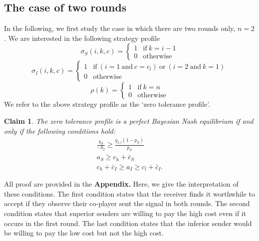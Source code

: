 \documentclass[11pt]{article}
\theoremstyle{plainCl1}
\newtheorem{Claim}{Claim}
\begin{document}

\subsection{The case of two rounds}

In the following, we first study the case in which there are two rounds only, $n\!=\!2$. We are interested in the following strategy profile
\begin{equation}
\sigma_S(i,k,c) = \left\{
\begin{array}{ll}
1	&\text{if}~k=i-1\\
0	&\text{otherwise}
\end{array}
\right.
\end{equation}
\begin{equation}
\sigma_I(i,k,c)= \left\{
\begin{array}{ll}
1	&\text{if}~(i\!=\!1 ~\text{and}~ c\!=\!c_l)~\text{or}~(i\!=\!2~\text{and}~k\!=\!1)\\
0	&\text{otherwise}
\end{array}
\right.
\end{equation}
\begin{equation}
\rho(k) = \left\{
\begin{array}{ll}
1	&\text{if}~k=n\\
0	&\text{otherwise}
\end{array}
\right.
\end{equation}
We refer to the above strategy profile as the `zero tolerance profile'. 

\begin{Claim}
The zero tolerance profile is a perfect Bayesian Nash equilibrium if and only if the following conditions hold:
\begin{equation}
\begin{array}{c}
\displaystyle \frac{b_S}{-b_I} \ge \frac{q_{I,l}(1\!-\!p_S)}{p_S}\\[0.4cm]
\displaystyle a_S \ge c_h +  \bar{c}_S\\[0.4cm]
\displaystyle  c_h +  \bar{c}_I \ge a_I \ge c_l + \bar{c}_I. 
\end{array}
\end{equation}
\end{Claim}

\noindent
All proof are provided in the {\bf Appendix.} Here, we give the interpretation of these conditions. The first condition states that the receiver finds it worthwhile to accept if they observe their co-player sent the signal in both rounds. The second condition states that superior senders are willing to pay the high cost even if it occurs in the first round. The last condition states that the inferior sender would be willing to pay the low cost but not the high cost.\\
\end{document}

